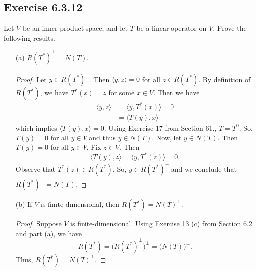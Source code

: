 \subsection*{Exercise 6.3.12} Let \( V  \) be an inner product space, and let \( T  \) be a linear operator on \( V  \). Prove the following results.
\begin{enumerate}
    \item[(a)] \( R(T^{*})^{\perp} = N(T) \).
        \begin{proof}
        Let \( y \in R(T^{*})^{\perp} \). Then \( \langle y , z \rangle = 0  \) for all \( z \in R(T^{*}) \). By definition of \( R(T^{*}) \), we have \( T^{*}(x) = z  \) for some \( x \in V  \). Then we have
        \begin{align*}
            \langle y , z \rangle &= \langle y , T^{*}(x) \rangle = 0 \\
                                  &= \langle T(y)  , x  \rangle
        \end{align*}
        which implies \( \langle T(y) , x \rangle = 0  \). Using Exercise 17 from Section 61., \( T = T^{0} \). So, \( T(y) = 0  \) for all \( y \in V    \) and thus \( y \in N(T) \). Now, let \( y \in N(T) \). Then \( T(y) = 0  \) for all \( y \in V  \). Fix \( z \in V  \). Then
        \[  \langle T(y) , z  \rangle = \langle y  , T^{*}(z) \rangle = 0.  \]
        Observe that \( T^{*}(z) \in R(T^{*}) \). So, \( y \in R(T^{*})^{\perp} \) and we conclude that \( R(T^{*})^{\perp} = N(T) \).
        \end{proof}
    \item[(b)] If \( V  \) is finite-dimensional, then \( R(T^{*}) = N(T)^{\perp} \).
        \begin{proof}
        Suppose \( V  \) is finite-dimensional. Using Exercise 13 (c) from Section 6.2 and part (a), we have
        \[ R(T^{*}) = \Big(R(T^{*})^{\perp}\Big)^{\perp} = \Big( N(T) \Big)^{\perp}.    \]
        Thus, \( R(T^{*}) = N(T)^{\perp} \).
        \end{proof}
\end{enumerate}


